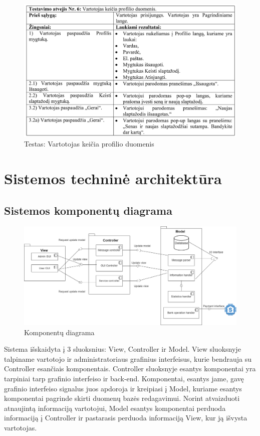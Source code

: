 \documentclass[oneside]{VUMIFPSkursinis}
\begin{document}
			\begin{figure}[h]
    				\centering
    				\includegraphics[width=1\textwidth]{test6.png}
    				\caption{Testas: Vartotojas keičia profilio duomenis}
    				\label{fig:Testas: Vartotojas keičia profilio duomenis}
			\end{figure}

\section{Sistemos techninė architektūra}
	\subsection{Sistemos komponentų diagrama}
			\begin{figure}[h]
    				\centering
    				\includegraphics[width=1\textwidth]{KomponentuDiagrama.png}
    				\caption{Komponentų diagrama}
    				\label{fig:Komponentų diagrama}
			\end{figure}

	Sistema išskaidyta į 3 sluoksnius: View, Controller ir Model. View sluoksnyje talpiname vartotojo ir administratoriaus grafinius interfeisus, kurie bendrauja su Controller esančiais komponentais. Controller sluoksnyje esantys komponentai yra tarpiniai tarp grafinio interfeiso ir back-end. Komponentai, esantys jame, gavę grafinio interfeiso signalus juos apdoroja ir kreipiasi į Model, kuriame esantys komponentai pagrinde skirti duomenų bazės redagavimui. Norint atvaizduoti atnaujintą informaciją vartotojui, Model esantys komponentai perduoda informaciją į Controller ir pastarasis perduoda informaciją View, kur ją išvysta vartotojas.
	\pagebreak
\end{document}
